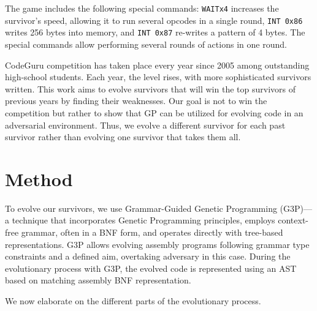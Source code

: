 \documentclass[dvipsnames, format=sigconf]{acmart}
\begin{document}
The game includes the following special commands: \texttt{WAITx4} increases the survivor's speed, allowing it to run several opcodes in a single round, \texttt{INT 0x86} writes 256 bytes into memory, and \texttt{INT 0x87} re-writes a pattern of 4 bytes. The special commands allow performing several rounds of actions in one round.  

CodeGuru competition has taken place every year since 2005 among outstanding high-school students. Each year, the level rises, with more sophisticated survivors written.
This work aims to evolve survivors that will win the top survivors of previous years by finding their weaknesses. Our goal is not to win the competition but rather to show that GP can be utilized for evolving code in an adversarial environment. Thus, we evolve a different survivor for each past survivor rather than evolving one survivor that takes them all.


\section{Method}
To evolve our survivors, we use Grammar-Guided Genetic Programming (G3P)---a technique that incorporates Genetic Programming principles, employs context-free grammar, often in a BNF form, and operates directly with tree-based representations. G3P allows evolving assembly programs following grammar type constraints and a defined aim, overtaking adversary in this case. During the evolutionary process with G3P, the evolved code is represented using an AST based on matching assembly BNF representation. 

We now elaborate on the different parts of the evolutionary process.
\end{document}
